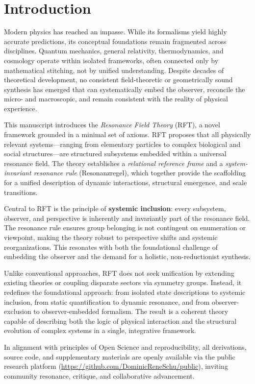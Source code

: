 \documentclass[12pt]{article}
\begin{document}
	\section{Introduction}
	
	Modern physics has reached an impasse. While its formalisms yield highly accurate predictions, its conceptual foundations remain fragmented across disciplines. Quantum mechanics, general relativity, thermodynamics, and cosmology operate within isolated frameworks, often connected only by mathematical stitching, not by unified understanding. Despite decades of theoretical development, no consistent field-theoretic or geometrically sound synthesis has emerged that can systematically embed the observer, reconcile the micro- and macroscopic, and remain consistent with the reality of physical experience.
	
	This manuscript introduces the \textit{Resonance Field Theory} (RFT), a novel framework grounded in a minimal set of axioms. RFT proposes that all physically relevant systems—ranging from elementary particles to complex biological and social structures—are structured subsystems embedded within a universal resonance field. The theory establishes a \textit{relational reference frame} and a \textit{system-invariant resonance rule} (Resonanzregel), which together provide the scaffolding for a unified description of dynamic interactions, structural emergence, and scale transitions.
	
	Central to RFT is the principle of \textbf{systemic inclusion}: every subsystem, observer, and perspective is inherently and invariantly part of the resonance field. The resonance rule ensures group belonging is not contingent on enumeration or viewpoint, making the theory robust to perspective shifts and systemic reorganizations. This resonates with both the foundational challenge of embedding the observer and the demand for a holistic, non-reductionist synthesis.
	
	Unlike conventional approaches, RFT does not seek unification by extending existing theories or coupling disparate sectors via symmetry groups. Instead, it redefines the foundational approach: from isolated state descriptions to systemic inclusion, from static quantification to dynamic resonance, and from observer-exclusion to observer-embedded formalism. The result is a coherent theory capable of describing both the logic of physical interaction and the structural evolution of complex systems in a single, integrative framework.
	
	In alignment with principles of Open Science and reproducibility, all derivations, source code, and supplementary materials are openly available via the public research platform (\url{https://github.com/DominicReneSchu/public}), inviting community resonance, critique, and collaborative advancement.
	
\end{document}

